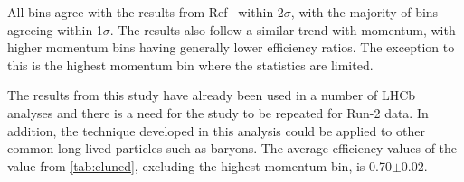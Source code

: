 All bins agree with the results from Ref~\cite{DDpat} within 2$\sigma$, with the majority of bins agreeing within 1$\sigma$. The results also follow a similar trend with momentum, with higher momentum bins having generally lower efficiency ratios. The exception to this is the highest momentum bin where the statistics are limited.

The results from this study have already been used in a number of LHCb analyses and there is a need for the study to be repeated for Run-2 data. In addition, the technique developed in this analysis could be applied to other common long-lived particles such as \Lz baryons. The average efficiency values of the value from \autoref{tab:eluned}, excluding the highest momentum bin, is 0.70$\pm$0.02.





